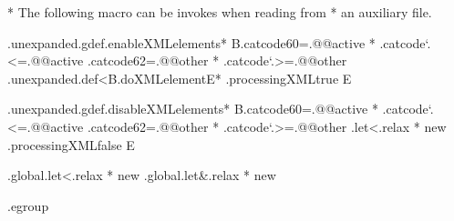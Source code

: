 * The following macro can be invokes when reading from 
* an auxiliary file. 

.unexpanded.gdef.enableXMLelements* 
  B.catcode60=.@@active * .catcode`.<=.@@active 
   .catcode62=.@@other  * .catcode`.>=.@@other
   .unexpanded.def<B.doXMLelementE*
   .processingXMLtrue
  E

.unexpanded.gdef.disableXMLelements* 
  B.catcode60=.@@active * .catcode`.<=.@@active 
   .catcode62=.@@other  * .catcode`.>=.@@other
   .let<.relax * new 
   .processingXMLfalse
  E

.global.let<.relax * new 
.global.let&.relax * new 

.egroup

\def\disableXML{\setnormalcatcodes\processingXMLfalse}



